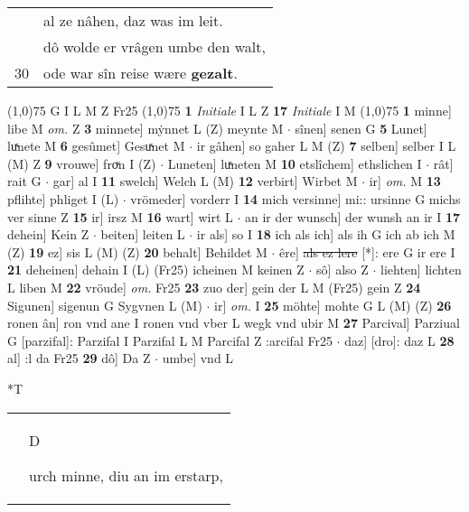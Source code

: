 \documentclass[8pt,a4paper,notitlepage]{article}
\begin{document}
\begin{table}[ht]
\begin{minipage}[t]{0.5\linewidth}
\begin{tabular}{rl}
 & al ze nâhen, daz was im leit.\\ 
 & dô wolde er vrâgen umbe den walt,\\ 
30 & ode war sîn reise wære \textbf{gezalt}.\\ 
\end{tabular}
\scriptsize
\line(1,0){75} \newline
G I L M Z Fr25 \newline
\line(1,0){75} \newline
\textbf{1} \textit{Initiale} I L Z  \textbf{17} \textit{Initiale} I M  \newline
\line(1,0){75} \newline
\textbf{1} minne] libe M \textit{om.} Z \textbf{3} minnete] mẏnnet L (Z) meynte M  $\cdot$ sînen] senen G \textbf{5} Lunet] luͯnete M \textbf{6} gesûmet] Gesuͯnet M  $\cdot$ ir gâhen] so gaher L M (Z) \textbf{7} selben] selber I L (M) Z \textbf{9} vrouwe] froͮn I (Z)  $\cdot$ Luneten] luͯneten M \textbf{10} etslîchem] ethslichen I  $\cdot$ rât] rait G  $\cdot$ gar] al I \textbf{11} swelch] Welch L (M) \textbf{12} verbirt] Wirbet M  $\cdot$ ir] \textit{om.} M \textbf{13} pflihte] phliget I (L)  $\cdot$ vrömeder] vorderr I \textbf{14} mich versinne] mi:: ursinne G michs ver sinne Z \textbf{15} ir] irsz M \textbf{16} wart] wirt L  $\cdot$ an ir der wunsch] der wunsh an ir I \textbf{17} dehein] Kein Z  $\cdot$ beiten] leiten L  $\cdot$ ir als] so I \textbf{18} ich als ich] als ih G ich ab ich M (Z) \textbf{19} ez] sis L (M) (Z) \textbf{20} behalt] Behildet M  $\cdot$ êre] \sout{als ez lere} [*]: ere G ir ere I \textbf{21} deheinen] dehain I (L) (Fr25) icheinen M keinen Z  $\cdot$ sô] also Z  $\cdot$ liehten] lichten L liben M \textbf{22} vröude] \textit{om.} Fr25 \textbf{23} zuo der] gein der L M (Fr25) gein Z \textbf{24} Sigunen] sigenun G Sygvnen L (M)  $\cdot$ ir] \textit{om.} I \textbf{25} möhte] mohte G L (M) (Z) \textbf{26} ronen ân] ron vnd ane I ronen vnd vber L wegk vnd ubir M \textbf{27} Parcival] Parziual G [parzifal]: Parzifal I Parzifal L M Parcifal Z :arcifal Fr25  $\cdot$ daz] [dro]: daz L \textbf{28} al] :l da Fr25 \textbf{29} dô] Da Z  $\cdot$ umbe] vnd L \newline
\end{minipage}
\hspace{0.5cm}
\begin{minipage}[t]{0.5\linewidth}
\small
\begin{center}*T
\end{center}
\begin{tabular}{rl}
 & \begin{large}D\end{large}urch minne, diu an im erstarp,\\ 

\end{tabular}
\end{minipage}
\end{table}
\end{document}
